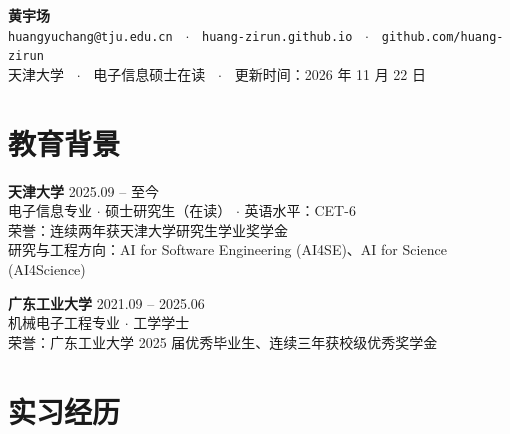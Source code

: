 \documentclass[10pt,letterpaper]{article}
\begin{document}
\begin{center}
  {\Huge\bfseries 黄宇场} \\[5pt]
  \texttt{huangyuchang@tju.edu.cn}
  \textbf{~$\cdot$~}
  \texttt{huang-zirun.github.io}
  \textbf{~$\cdot$~}
  \texttt{github.com/huang-zirun} \\[2pt]
  天津大学 \textbf{~$\cdot$~} 电子信息硕士在读 \textbf{~$\cdot$~} 更新时间：2026 年 11 月 22 日
\end{center}

\vspace{-4pt}

\section{教育背景}

\textbf{天津大学} \hfill 2025.09 -- 至今 \\
电子信息专业 $\cdot$ 硕士研究生（在读） $\cdot$ 英语水平：CET-6 \\
荣誉：连续两年获天津大学研究生学业奖学金 \\
研究与工程方向：AI for Software Engineering (AI4SE)、AI for Science (AI4Science)

\vspace{3pt}

\textbf{广东工业大学} \hfill 2021.09 -- 2025.06 \\
机械电子工程专业 $\cdot$ 工学学士 \\
荣誉：广东工业大学 2025 届优秀毕业生、连续三年获校级优秀奖学金

\section{实习经历}
\end{document}
